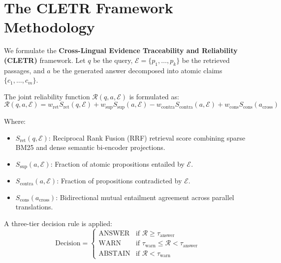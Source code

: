 \section{The CLETR Framework Methodology}
We formulate the \textbf{Cross-Lingual Evidence Traceability and Reliability (CLETR)} framework. Let $q$ be the query, $\mathcal{E} = \{p_1, \dots, p_k\}$ be the retrieved passages, and $a$ be the generated answer decomposed into atomic claims $\{c_1, \dots, c_m\}$.

The joint reliability function $\mathcal{R}(q, a, \mathcal{E})$ is formulated as:
\begin{equation}
\mathcal{R}(q, a, \mathcal{E}) = w_{\text{ret}} S_{\text{ret}}(q, \mathcal{E}) + w_{\text{sup}} S_{\text{sup}}(a, \mathcal{E}) - w_{\text{contra}} S_{\text{contra}}(a, \mathcal{E}) + w_{\text{cons}} S_{\text{cons}}(a_{\text{cross}})
\end{equation}

Where:
\begin{itemize}
    \item $S_{\text{ret}}(q, \mathcal{E})$: Reciprocal Rank Fusion (RRF) retrieval score combining sparse BM25 and dense semantic bi-encoder projections.
    \item $S_{\text{sup}}(a, \mathcal{E})$: Fraction of atomic propositions entailed by $\mathcal{E}$.
    \item $S_{\text{contra}}(a, \mathcal{E})$: Fraction of propositions contradicted by $\mathcal{E}$.
    \item $S_{\text{cons}}(a_{\text{cross}})$: Bidirectional mutual entailment agreement across parallel translations.
\end{itemize}

A three-tier decision rule is applied:
\begin{equation}
\text{Decision} = \begin{cases} 
\text{ANSWER} & \text{if } \mathcal{R} \ge \tau_{\text{answer}} \\
\text{WARN} & \text{if } \tau_{\text{warn}} \le \mathcal{R} < \tau_{\text{answer}} \\
\text{ABSTAIN} & \text{if } \mathcal{R} < \tau_{\text{warn}}
\end{cases}
\end{equation}
